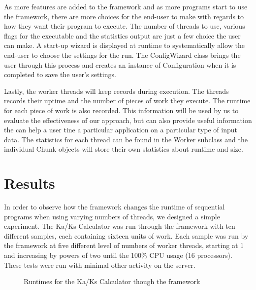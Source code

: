 \documentclass[12pt]{article}
\begin{document}
As more features are added to the framework and as more programs start to use 
the framework, there are more choices for the end-user to make with regards to 
how they want their program to execute. The number of threads to use, various 
flags for the executable and the statistics output are just a few choice the 
user can make. A start-up wizard is displayed at runtime to systematically allow
the end-user to choose the settings for the run. The ConfigWizard class brings 
the user through this process and creates an instance of Configuration when it 
is completed to save the user's settings.

Lastly, the worker threads will keep records during execution. The threads 
records their uptime and the number of pieces of work they execute. The runtime 
for each piece of work is also recorded. This information will be used by us to
evaluate the effectiveness of our approach, but can also provide useful
information the can help a user tine a particular application on a particular
type of input data. The statistics for each thread can be found in the Worker 
subclass and the individual Chunk objects will store their own statistics about 
runtime and size.

\section{Results}

In order to observe how the framework changes the runtime of sequential programs 
when using varying numbers of threads, we designed a simple experiment. The 
Ka/Ks Calculator was run through the framework with ten different samples, each 
containing sixteen units of work. Each sample was run by the framework at five 
different level of numbers of worker threads, starting at 1 and increasing by 
powers of two until the 100\% CPU usage (16 processors). These tests were run
with minimal other activity on the server.

\begin{figure}
{}
\caption{Runtimes for the Ka/Ks Calculator though the framework}
\label{fig:graph}
\end{figure}
\end{document}
